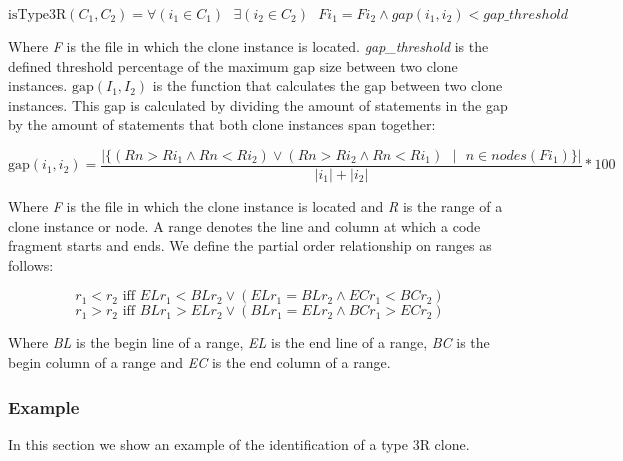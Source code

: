 \begin{equation}\label{eq:istype3r}
\text{isType3R}(C_1, C_2) = \forall (i_1 \in C_1)\text{ } \exists (i_2 \in C_2)\text{ } Fi_1 = Fi_2 \land gap(i_1, i_2) < gap\_threshold
\end{equation}

Where \textit{F} is the file in which the clone instance is located. \textit{gap\_threshold} is the defined threshold percentage of the maximum gap size between two clone instances. $\text{gap}(I_1, I_2)$ is the function that calculates the gap between two clone instances. This gap is calculated by dividing the amount of statements in the gap by the amount of statements that both clone instances span together:

\begin{equation}\label{eq:t3rgap}
\text{gap}(i_1, i_2) = \frac{|\{(Rn>Ri_1 \land Rn<Ri_2) \lor (Rn>Ri_2 \land Rn<Ri_1)\text{ }|\text{ } n \in nodes(Fi_1)\}|}{|i_1| + |i_2|} * 100
\end{equation}

Where \textit{F} is the file in which the clone instance is located and \textit{R} is the range of a clone instance or node. A range denotes the line and column at which a code fragment starts and ends. We define the partial order relationship on ranges as follows:

\begin{equation}\label{eq:rangetotalorder}
r_1 < r_2 \text{ iff } ELr_1 < BLr_2 \lor (ELr_1 = BLr_2 \land ECr_1 < BCr_2)
\end{equation}
\begin{equation}\label{eq:rangetotalorder2}
r_1 > r_2 \text{ iff } BLr_1 > ELr_2 \lor (BLr_1 = ELr_2 \land BCr_1 > ECr_2)
\end{equation}

Where \textit{BL} is the begin line of a range, \textit{EL} is the end line of a range, \textit{BC} is the begin column of a range and \textit{EC} is the end column of a range.

\subsubsection{Example}
In this section we show an example of the identification of a type 3R clone.

